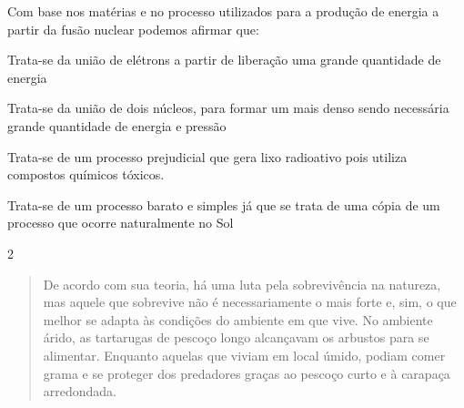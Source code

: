 Com base nos matérias e no processo utilizados para a produção de
energia a partir da fusão nuclear podemos afirmar que:

\begin{escolha}
\item
  Trata-se da união de elétrons a partir de liberação uma grande
  quantidade de energia
\item
  Trata-se da união de dois núcleos, para formar um mais denso sendo
  necessária grande quantidade de energia e pressão
\item
  Trata-se de um processo prejudicial que gera lixo radioativo pois
  utiliza compostos químicos tóxicos.
\item
  Trata-se de um processo barato e simples já que se trata de uma cópia
  de um processo que ocorre naturalmente no Sol
\end{escolha}


\num{2}
\begin{quote}
  De acordo com sua teoria, há uma luta pela sobrevivência na
  natureza, mas aquele que sobrevive não é necessariamente o mais forte
  e, sim, o que melhor se adapta às condições do ambiente em que vive.
  No ambiente árido, as tartarugas de pescoço longo alcançavam os
  arbustos para se alimentar. Enquanto aquelas que viviam em local
  úmido, podiam comer grama e se proteger dos predadores graças ao
  pescoço curto e à carapaça arredondada.

\end{quote}

